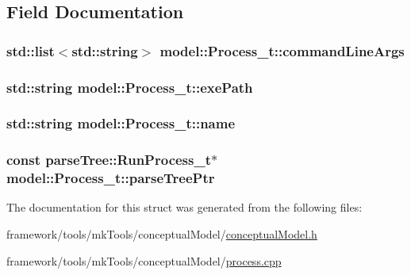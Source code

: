 \subsection{Field Documentation}
\subsubsection[{\texorpdfstring{command\+Line\+Args}{commandLineArgs}}]{\setlength{\rightskip}{0pt plus 5cm}std\+::list$<$std\+::string$>$ model\+::\+Process\+\_\+t\+::command\+Line\+Args}\hypertarget{structmodel_1_1_process__t_abdfbb3593d45e40bc278680a46f868ef}{}\label{structmodel_1_1_process__t_abdfbb3593d45e40bc278680a46f868ef}
\subsubsection[{\texorpdfstring{exe\+Path}{exePath}}]{\setlength{\rightskip}{0pt plus 5cm}std\+::string model\+::\+Process\+\_\+t\+::exe\+Path}\hypertarget{structmodel_1_1_process__t_ab16db4e52d9cb4acbc435ed9dde11b92}{}\label{structmodel_1_1_process__t_ab16db4e52d9cb4acbc435ed9dde11b92}
\subsubsection[{\texorpdfstring{name}{name}}]{\setlength{\rightskip}{0pt plus 5cm}std\+::string model\+::\+Process\+\_\+t\+::name\hspace{0.3cm}{\ttfamily [private]}}\hypertarget{structmodel_1_1_process__t_affa257a763099deb8c37763725720cda}{}\label{structmodel_1_1_process__t_affa257a763099deb8c37763725720cda}
\subsubsection[{\texorpdfstring{parse\+Tree\+Ptr}{parseTreePtr}}]{\setlength{\rightskip}{0pt plus 5cm}const {\bf parse\+Tree\+::\+Run\+Process\+\_\+t}$\ast$ model\+::\+Process\+\_\+t\+::parse\+Tree\+Ptr}\hypertarget{structmodel_1_1_process__t_a5740c1d62fe982fc00ad4f07e03b5abc}{}\label{structmodel_1_1_process__t_a5740c1d62fe982fc00ad4f07e03b5abc}


The documentation for this struct was generated from the following files\+:\begin{DoxyCompactItemize}
\item 
framework/tools/mk\+Tools/conceptual\+Model/\hyperlink{conceptual_model_8h}{conceptual\+Model.\+h}\item 
framework/tools/mk\+Tools/conceptual\+Model/\hyperlink{process_8cpp}{process.\+cpp}\end{DoxyCompactItemize}
